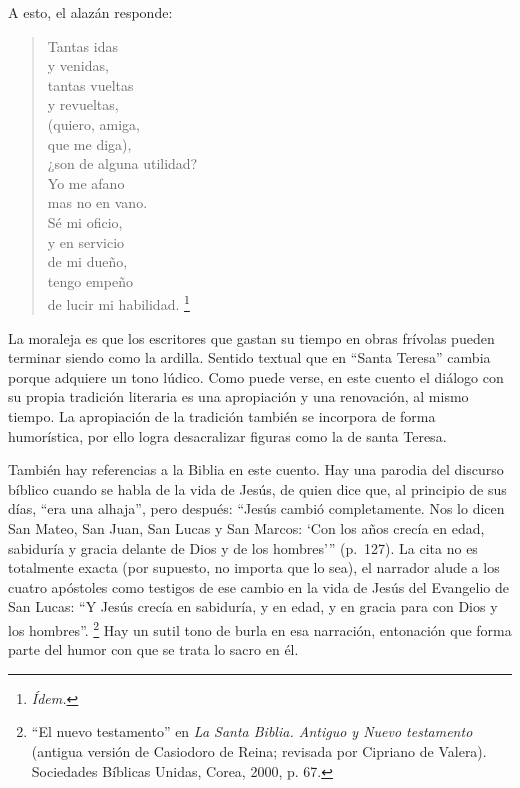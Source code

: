 \documentclass[14pt,twoside,final]{extbook} %
\let\oldfootnote\footnote
\renewcommand\footnote[1]{%
\oldfootnote{\hspace{1mm}#1}}
\begin{document}
A esto, el alazán responde:
\begin{verse}
Tantas idas \\
y venidas, \\
tantas vueltas \\
y revueltas, \\
(quiero, amiga, \\
que me diga), \\
¿son de alguna utilidad? \\
Yo me afano \\
mas no en vano. \\
Sé mi oficio, \\
y en servicio \\
de mi dueño, \\
tengo empeño \\
de lucir mi habilidad.\footnote{\em Ídem.}
\end{verse}
La moraleja es que los escritores que gastan su tiempo en obras frívolas pueden terminar siendo como la ardilla. Sentido textual que en ``Santa Teresa'' cambia porque adquiere un tono lúdico. Como puede verse, en este cuento el diálogo con su propia tradición literaria es una apropiación y una renovación, al mismo tiempo. La apropiación de la tradición también se incorpora de forma humorística, por ello logra desacralizar figuras como la de santa Teresa.

También hay referencias a la Biblia en este cuento. Hay una parodia del discurso bíblico cuando se habla de la vida de Jesús, de quien dice que, al principio de sus días, ``era una alhaja'', pero después: ``Jesús cambió completamente. Nos lo dicen San Mateo, San Juan, San Lucas y San Marcos: `Con los años crecía en edad, sabiduría y gracia delante de Dios y de los hombres'{}'' (p.~127). La cita no es totalmente exacta (por supuesto, no importa que lo sea), el narrador alude a los cuatro apóstoles como testigos de ese cambio en la vida de Jesús del Evangelio de San Lucas: ``Y Jesús crecía en sabiduría, y en edad, y en gracia para con Dios y los hombres''.\footnote{``El nuevo testamento'' en \emph{La Santa Biblia. Antiguo y Nuevo testamento} (antigua versión de Casiodoro de Reina; revisada por Cipriano de Valera). Sociedades Bíblicas Unidas, Corea, 2000, p. 67.} Hay un sutil tono de burla en esa narración, entonación que forma parte del humor con que se trata lo sacro en él.\protect\enlargethispage*{\baselineskip}
\end{document}
